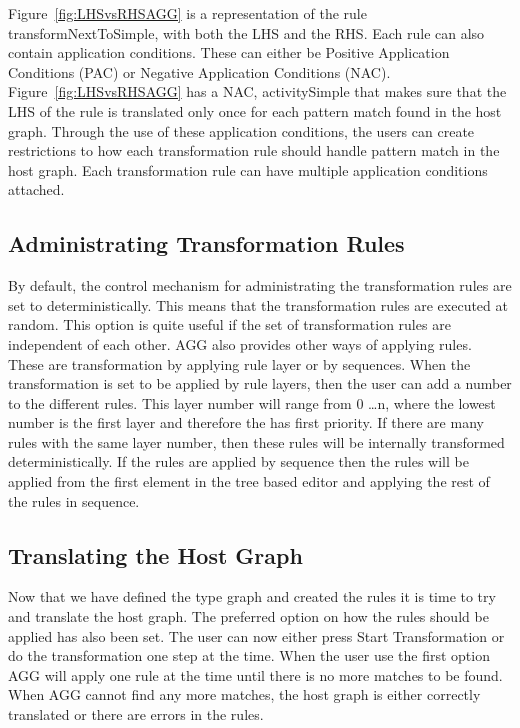 Figure~\ref{fig:LHSvsRHSAGG} is a representation of the rule
transformNextToSimple, with both the LHS and the RHS. Each rule can also
contain application conditions. These can either be Positive Application
Conditions (PAC) or Negative Application Conditions (NAC).
Figure~\ref{fig:LHSvsRHSAGG} has a NAC, activitySimple that makes sure that the
LHS of the rule is translated only once for each pattern match found in the
host graph. Through the use of these application conditions, the users can
create restrictions to how each transformation rule should handle pattern match
in the host graph. Each transformation rule can have multiple application
conditions attached.

\subsection{Administrating Transformation Rules}

By default, the control mechanism for administrating the transformation rules
are set to deterministically. This means that the transformation rules are
executed at random. This option is quite useful if the set of transformation
rules are independent of each other. AGG also provides other ways of applying
rules. These are transformation by applying rule layer or by sequences. When the
transformation is set to be applied by rule layers, then the user can add a
number to the different rules. This layer number will range from 0 \ldots n,
where the lowest number is the first layer and therefore the has first
priority. If there are many rules with the same layer number, then these rules
will be internally transformed deterministically. If the rules are applied
by sequence then the rules will be applied from the first element in the tree
based editor and applying the rest of the rules in sequence.

\subsection{Translating the Host Graph}

Now that we have defined the type graph and created the rules it is time to try
and translate the host graph. The preferred option on how the rules should be
applied has also been set. The user can now either press Start Transformation or
do the transformation one step at the time. When the user use the first option
AGG will apply one rule at the time until there is no more matches to be found.
When AGG cannot find any more matches, the host graph is either correctly
translated or there are errors in the rules. 

